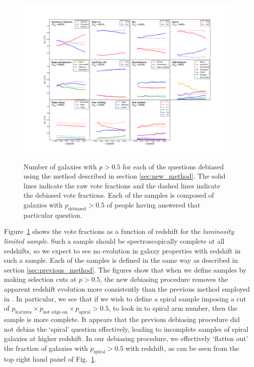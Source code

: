 \documentclass[useAMS,usenatbib]{mn2e}
\begin{document}
\begin{figure}
		\centering

        \includegraphics[width=1\textwidth]{Bias_imgs/vote_panel_plot_debiased.pdf}

        \caption{Number of galaxies with $p>0.5$ for each of the questions debiased using the method described in section \ref{sec:new_method}. The solid lines indicate the raw vote fractions and the dashed lines indicate the debiased vote fractions. Each of the samples is composed of galaxies with $p_{\textrm{debiased}}>0.5$ of people having answered that particular question.}

        \label{fig:vote_panel_debiased}

\end{figure}

Figure~\ref{fig:vote_panel_debiased} shows the vote fractions as a function of redshift for the \textit{luminosity limited sample}. Such a sample should be spectroscopically complete at all redshifts, so we expect to see no evolution in galaxy properties with redshift in such a sample. Each of the samples is defined in the same way as described in section \ref{sec:previous_method}. The figures show that when we define samples by making selection cuts at $p>0.5$, the new debiasing procedure removes the apparent redshift evolution more consistently than the previous method employed in \citet{Willett_13}. In particular, we see that if we wish to define a spiral sample imposing a cut of $p_{\textrm{features}} \times p_{\textrm{not edge-on}} \times p_{\textrm{spiral}} > 0.5$, to look in to spiral arm number, then the sample is more complete. It appears that the previous debiasing procedure did not debias the `spiral' question effectively, leading to incomplete samples of spiral galaxies at higher redshift. In our debiasing procedure, we effectively `flatten out' the fraction of galaxies with $p_{\textrm{spiral}} > 0.5$ with redshift, as can be seen from the top right hand panel of Fig.~\ref{fig:vote_panel_debiased}.
\end{document}
